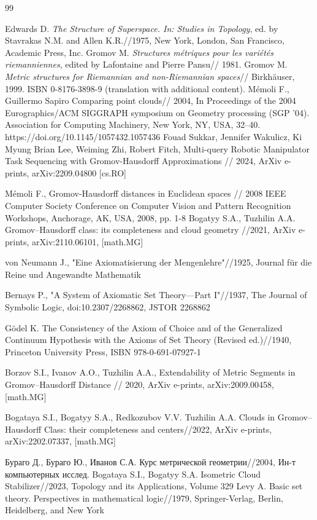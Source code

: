 \documentclass[11pt,twoside,draft
]{article}
\begin{document}
\begin{thebibliography}{99}

   Edwards D. \emph{The Structure of Superspace. In:
  Studies in Topology}, ed. by Stavrakas N.M. and Allen K.R.//1975,
  New York, London, San Francisco, Academic Press, Inc.
   Gromov M. \emph{Structures m\'etriques pour les
  vari\'et\'es riemanniennes}, edited by Lafontaine and Pierre Pansu// 1981.
   Gromov M. \emph{Metric structures for Riemannian
  and non-Riemannian spaces}// Birkh\"auser, 1999. ISBN 0-8176-3898-9
  (translation with additional content).
  Mémoli F., Guillermo Sapiro Comparing point clouds// 2004, In
  Proceedings of the 2004 Eurographics/ACM SIGGRAPH symposium on
  Geometry processing (SGP '04). Association for Computing Machinery,
  New York, NY, USA, 32–40. https://doi.org/10.1145/1057432.1057436
   Fouad Sukkar, Jennifer Wakulicz, Ki Myung Brian
  Lee, Weiming Zhi, Robert Fitch, Multi-query Robotic Manipulator
  Task Sequencing with Gromov-Hausdorff Approximations // 2024, ArXiv e-prints,
  arXiv:2209.04800 [cs.RO]

  Mémoli F., Gromov-Hausdorff distances in Euclidean spaces // 2008
  IEEE Computer Society Conference on Computer Vision and Pattern
  Recognition Workshops, Anchorage, AK, USA, 2008, pp. 1-8
  Bogatyy S.A., Tuzhilin A.A. Gromov–Hausdorff class: its
  completeness and cloud geometry //2021, ArXiv e-prints,
  arXiv:2110.06101, [math.MG]

  von Neumann J., "Eine Axiomatisierung der Mengenlehre"//1925,
  Journal für die Reine und Angewandte Mathematik

  Bernays P., "A System of Axiomatic Set Theory—Part I"//1937, The
  Journal of Symbolic Logic, doi:10.2307/2268862, JSTOR 2268862

  Gödel K. The Consistency of the Axiom of Choice and of the
  Generalized Continuum Hypothesis with the Axioms of Set Theory
  (Revised ed.)//1940, Princeton University Press,  ISBN 978-0-691-07927-1

  Borzov S.I., Ivanov A.O., Tuzhilin A.A., Extendability of Metric Segments in
  Gromov–Hausdorff Distance // 2020, ArXiv e-prints,
  arXiv:2009.00458, [math.MG]

  Bogataya S.I., Bogatyy S.A., Redkozubov V.V. Tuzhilin A.A. Clouds
  in Gromov–Hausdorff Class: their
  completeness and centers//2022, ArXiv e-prints,
  arXiv:2202.07337, [math.MG]

  Бураго Д., Бураго Ю., Иванов С.А. Курс метрической геометрии//2004,
  Ин-т компьютерных исслед.
  Bogataya S.I., Bogatyy S.A. Isometric Cloud Stabilizer//2023,
  Topology and its Applications,
  Volume 329
  Levy A. Basic set theory. Perspectives in
  mathematical logic//1979, Springer-Verlag, Berlin, Heidelberg, and New York



\end{thebibliography}
\end{document}
